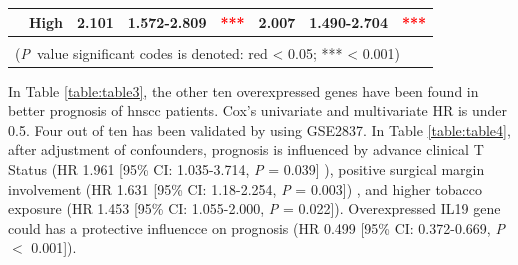 \documentclass[12pt, a4paper]{article}
\begin{document}
\begin{table}[hp]
{\begin{tabular}{|l|l|l|l|l|l|l|l|}
\cline{2-8}
                                        & High                                                                                & 2.101                                                                          & 1.572-2.809                                                                   & \multicolumn{1}{c|}{\textcolor{red}{***}}                                     & 2.007                                                                          & 1.490-2.704                                                                   & \multicolumn{1}{c|}{\textcolor{red}{***}}                                      \\ 
\hline
\multicolumn{8}{|l|}{}                                                                                                                                                                                                                                                                                                                                                                                                                                                                                                                                                                                                           \\ 
\hline
\multicolumn{8}{|l|}{(\textit{P}~value significant codes is denoted: red \textless{} 0.05; *** \textless{} 0.001)}                                                                                                                                                                                                                                                                                                                                                                                                                                                                                                               \\
\hline
\end{tabular}
} %
{}
\label{table:table2}
\end{table}




In Table \ref{table:table3}, the other ten overexpressed genes have been found in better prognosis of \acrshort{hnscc} patients. Cox's univariate and multivariate HR is under 0.5.
Four out of ten has been validated by using GSE2837.
In Table \ref{table:table4},
after adjustment of confounders, prognosis is influenced by advance clinical T Status (HR 1.961 [95\% CI: 1.035-3.714, \textit{P} = 0.039] ), positive surgical margin involvement (HR 1.631 [95\% CI: 1.18-2.254, \textit{P} = 0.003]) , and higher tobacco exposure (HR 1.453 [95\% CI: 1.055-2.000, \textit{P} = 0.022]).
Overexpressed \acrshort{IL19} gene could has a protective influencce on prognosis (HR 0.499 [95\% CI: 0.372-0.669, \textit{P} $<$ 0.001]).
\end{document}
